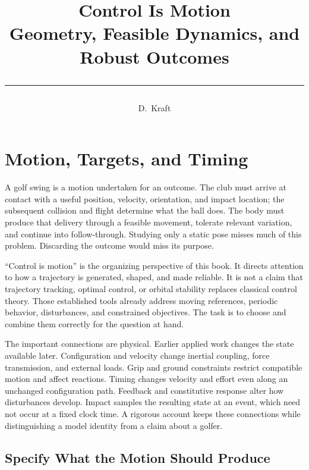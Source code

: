 \documentclass[12pt, openany]{book}
\title{%
  {\Huge\bfseries\color{chapblue} Control Is Motion}\\[0.4cm]
  {\Large Geometry, Feasible Dynamics, and Robust Outcomes}\\[0.6cm]
  {\color{chapblue}\rule{\textwidth}{2pt}}
}
\author{{\Large D.\ Kraft}}
\date{}
\theoremstyle{plain}
\begin{document}
\maketitle
\thispagestyle{empty}
\cleardoublepage

\tableofcontents
\cleardoublepage

\chapter{Motion, Targets, and Timing}
\label{ch:throwing_target}

A golf swing is a motion undertaken for an outcome. The club must arrive at
contact with a useful position, velocity, orientation, and impact location;
the subsequent collision and flight determine what the ball does. The body
must produce that delivery through a feasible movement, tolerate relevant
variation, and continue into follow-through. Studying only a static pose
misses much of this problem. Discarding the outcome would miss its purpose.

``Control is motion'' is the organizing perspective of this book. It directs
attention to how a trajectory is generated, shaped, and made reliable. It is
not a claim that trajectory tracking, optimal control, or orbital stability
replaces classical control theory. Those established tools already address
moving references, periodic behavior, disturbances, and constrained objectives.
The task is to choose and combine them correctly for the question at hand.

The important connections are physical. Earlier applied work changes the
state available later. Configuration and velocity change inertial coupling,
force transmission, and external loads. Grip and ground constraints restrict
compatible motion and affect reactions. Timing changes velocity and effort
even along an unchanged configuration path. Feedback and constitutive response
alter how disturbances develop. Impact samples the resulting state at an event,
which need not occur at a fixed clock time. A rigorous account keeps these
connections while distinguishing a model identity from a claim about a golfer.

\section{Specify What the Motion Should Produce}
\end{document}
